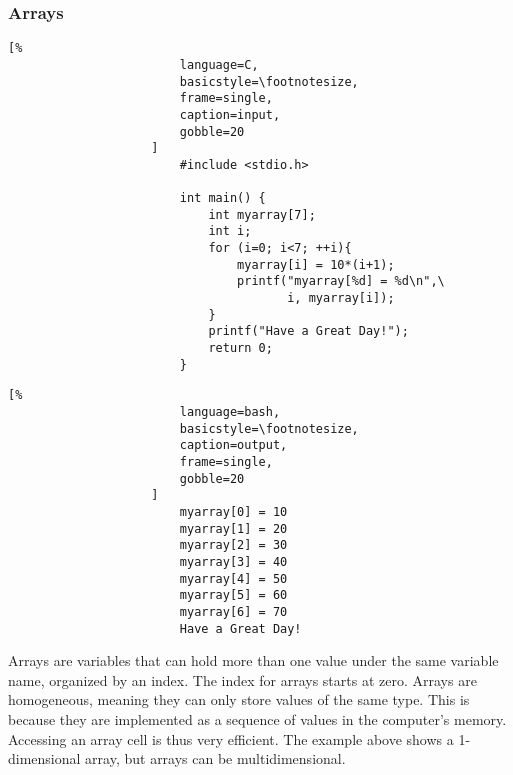 \documentclass[crop=false,class=book,oneside]{standalone}
\begin{document}
            \subsubsection{Arrays}
                \begin{minipage}[t]{.48\textwidth}
                    \centering
                    \begin{lstlisting}[%
                        language=C,
                        basicstyle=\footnotesize,
                        frame=single,
                        caption=input,
                        gobble=20
                    ]
                        #include <stdio.h>
                        
                        int main() {
                            int myarray[7];
                            int i;
                            for (i=0; i<7; ++i){
                                myarray[i] = 10*(i+1);
                                printf("myarray[%d] = %d\n",\
                                       i, myarray[i]);
                            }
                            printf("Have a Great Day!");
                            return 0;
                        }
                    \end{lstlisting}
                \end{minipage}\hfill
                \begin{minipage}[t]{.48\textwidth}
                    \centering
                    \begin{lstlisting}[%
                        language=bash,
                        basicstyle=\footnotesize,
                        caption=output,
                        frame=single,
                        gobble=20
                    ]
                        myarray[0] = 10
                        myarray[1] = 20
                        myarray[2] = 30
                        myarray[3] = 40
                        myarray[4] = 50
                        myarray[5] = 60
                        myarray[6] = 70
                        Have a Great Day!
                \end{lstlisting}
            \end{minipage}
                \newpage
                Arrays are variables that can hold more than one value
                under the same variable name, organized by an index. The
                index for arrays starts at zero. Arrays are
                homogeneous, meaning they can only store values of the
                same type. This is because they are implemented as a
                sequence of values in the computer's memory. Accessing
                an array cell is thus very efficient. The example above
                shows a 1-dimensional array, but arrays can be
                multidimensional.
\end{document}
